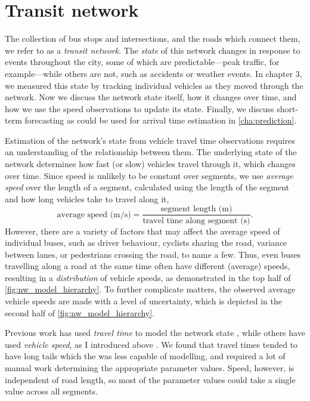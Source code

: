 \chapter{Transit network}
\label{cha:network_model}

The collection of bus stops and intersections, and the roads which connect them, we refer to as a \emph{transit network}. The \emph{state} of this network changes in response to events throughout the city, some of which are predictable---peak traffic, for example---while others are not, such as accidents or weather events. In chapter 3, we measured this state by tracking individual vehicles as they moved through the network. Now we discuss the network state itself, how it changes over time, and how we use the speed observations to update its state. Finally, we discuss short-term forecasting as could be used for arrival time estimation in \cref{cha:prediction}.


Estimation of the network's state from vehicle travel time observations requires an understanding of the relationship between them. The underlying state of the network determines how fast (or slow) vehicles travel through it, which changes over time. Since speed is unlikely to be constant over segments, we use \emph{average speed} over the length of a segment, calculated using the length of the segment and how long vehicles take to travel along it,
\begin{equation}
\label{eq:ch4:average_speed_formula}
\text{average speed (m/s)} = \frac{
\text{segment length (m)}
}{
\text{travel time along segment (s)}
}.
\end{equation}
However, there are a variety of factors that may affect the average speed of individual buses, such as driver behaviour, cyclists sharing the road, variance between lanes, or pedestrians crossing the road, to name a few. Thus, even buses travelling along a road at the same time often have different (average) speeds, resulting in a \emph{distribution} of vehicle speeds, as demonstrated in the top half of \cref{fig:nw_model_hierarchy}. To further complicate matters, the observed average vehicle speeds are made with a level of uncertainty, which is depicted in the second half of \cref{fig:nw_model_hierarchy}.


Previous work has used \emph{travel time} to model the network state \citep{Yu_2011,Cats_2015,Gong_2013,Shalaby_2004,Reinhoudt_1997}, while others have used \emph{vehicle speed}, as I introduced above \citep{Ma_2019,Celan_2017,Celan_2018,Xinghao_2013}. We found that travel times tended to have long tails which the \kf{} was less capable of modelling, and required a lot of manual work determining the appropriate parameter values. Speed, however, is independent of road length, so most of the parameter values could take a single value across all segments.


